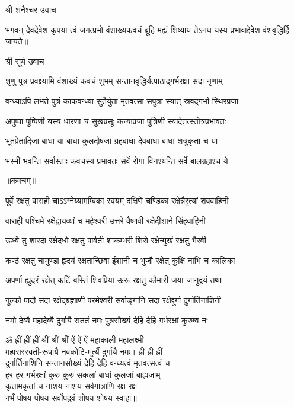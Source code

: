
\centerline{श्री शनैश्चर उवाच}

\twolineshloka
{भगवन् देवदेवेश कृपया त्वं जगत्प्रभो}
{वंशाख्यकवचं ब्रूहि मह्यं शिष्याय तेऽनघ}%
{यस्य प्रभावाद्देवेश वंशवृद्धिर्हि जायते॥}

\centerline{श्री सूर्य उवाच}

\twolineshloka
{शृणु पुत्र प्रवक्ष्यामि वंशाख्यं कवचं शुभम्}
{सन्तानवृद्धिर्यत्पाठाद्गर्भरक्षा सदा नृणाम्}%

\twolineshloka
{वन्ध्याऽपि लभते पुत्रं काकवन्ध्या सुतैर्युता}
{मृतवत्सा सपुत्रा स्यात् स्रवद्गर्भा स्थिरप्रजा}%

\twolineshloka
{अपुष्पा पुष्पिणी यस्य धारणा च सुखप्रसूः}
{कन्याप्रजा पुत्रिणी स्यादेतत्स्तोत्रप्रभावतः}%


\twolineshloka
{भूतप्रेतादिजा बाधा या बाधा कुलदोषजा}
{ग्रहबाधा देवबाधा बाधा शत्रुकृता च या}%

\twolineshloka
{भस्मी भवन्ति सर्वास्ताः कवचस्य प्रभावतः}
{सर्वे रोगा विनश्यन्ति सर्वे बालग्रहाश्च ये}%

\centerline{॥कवचम्॥}

\twolineshloka
{पूर्वे रक्षतु वाराही चाऽऽग्नेय्यामम्बिका स्वयम्}
{दक्षिणे चण्डिका रक्षेन्नैरृत्यां शववाहिनी}%

\twolineshloka
{वाराही पश्चिमे रक्षेद्वायव्यां च महेश्वरी}
{उत्तरे वैष्णवी रक्षेदीशाने सिंहवाहिनी}%

\twolineshloka
{ऊर्ध्वे तु शारदा रक्षेदधो रक्षतु पार्वती}
{शाकम्भरी शिरो रक्षेन्मुखं रक्षतु भैरवी}%

\twolineshloka
{कण्ठं रक्षतु चामुण्डा हृदयं रक्षताच्छिवा}
{ईशानी च भुजौ रक्षेत् कुक्षिं नाभिं च कालिका}%

\twolineshloka
{अपर्णा ह्युदरं रक्षेत् कटिं बस्तिं शिवप्रिया}
{ऊरू रक्षतु कौमारी जया जानुद्वयं तथा}%

\twolineshloka
{गुल्फौ पादौ सदा रक्षेद्ब्रह्माणी परमेश्वरी}
{सर्वाङ्गानि सदा रक्षेद्दुर्गा दुर्गार्तिनाशिनी}%

\twolineshloka
{नमो देव्यै महादेव्यै दुर्गायै सततं नमः}
{पुत्रसौख्यं देहि देहि गर्भरक्षां कुरुष्व नः}%

ॐ ह्रीं ह्रीं ह्रीं श्रीं श्रीं श्रीं ऐं ऐं ऐं महाकाली-महालक्ष्मी-\\
महासरस्वती-रूपायै नवकोटि-मूर्त्यै दुर्गायै नमः। ह्रीं ह्रीं ह्रीं\\
दुर्गार्तिनाशिनि सन्तानसौख्यं देहि देहि वन्ध्यत्वं मृतवत्सत्वं च\\
हर हर गर्भरक्षां कुरु कुरु सकलां बाधां कुलजां बाह्यजाम्\\
कृतामकृतां च नाशय नाशय सर्वगात्राणि रक्ष रक्ष \\
गर्भं पोषय पोषय सर्वोपद्रवं शोषय शोषय स्वाहा॥

